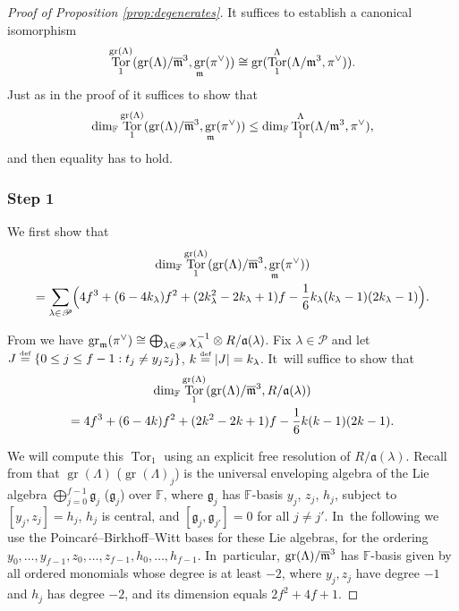 \documentclass[JEP,XML,SOM,Unicode,NoFloatCountersInSection, NoEqCountersInSection,published]{cedram}
\let\ovl\overline
\newcommand{\defeq}{\stackrel{\textrm{\tiny{\upshape{def}}}}{=}}
\newcommand{\F}{\mathbb{F}}
\renewcommand{\P}{\mathscr P}
\DeclareMathOperator{\gr}{gr}
\DeclareMathOperator{\Tor}{Tor}
\theoremstyle{plain}
\theoremstyle{definition}
\begin{document}
\begin{proof}[Proof of Proposition \ref{prop:degenerates}]
It suffices to establish a canonical isomorphism
\[
\Tor_1^{\gr(\Lambda)}(\gr(\Lambda)/\ovl\m^3,\gr_\m(\pi^{\vee}))\cong \gr(\Tor_1^{\Lambda}(\Lambda/\m^3,\pi^{\vee})).
\]
Just as in the proof of \cite[Cor.\,2.4.8 \& Cor.~2.5.1]{BHHMS4} it suffices to show that
\[
\dim_\F \Tor_1^{\gr(\Lambda)}(\gr(\Lambda)/\ovl\m^3,\gr_\m(\pi^{\vee})) \le \dim_\F \Tor_1^{\Lambda}(\Lambda/\m^3,\pi^{\vee}),
\]
and then equality has to hold.

\subsubsection*{Step 1} We first show that
\begin{multline*}
\dim_\F \Tor_1^{\gr(\Lambda)}(\gr(\Lambda)/\ovl\m^3,\gr_\m(\pi^{\vee})) \\ = \sum_{\lambda \in \P} \Bigl(4f^3 + (6-4k_\lambda)f^2 + (2k_\lambda^2-2k_\lambda+1)f - \frac 16 k_\lambda(k_\lambda-1)(2k_\lambda-1)\Bigr).
\end{multline*}

From \cite[Th.\,2.1.2]{BHHMS4} we have
$\gr_\m(\pi^{\vee}) \cong \bigoplus_{\lambda\in\mathscr{P}}\chi_{\lambda}^{-1}\otimes R/\mathfrak{a}(\lambda)$.
Fix $\lambda \in \P$ and let $J \defeq \{0 \le j \le f-1: t_j \ne y_jz_j \}$, $k \defeq |J| = k_\lambda$. It~will suffice to show that
\begin{multline}\label{eq:gr-lambda-formula}
\dim_\F \Tor_1^{\gr(\Lambda)}(\gr(\Lambda)/\ovl\m^3,R/\mathfrak{a}(\lambda))\\
= 4f^3 + (6-4k)f^2 + (2k^2-2k+1)f - \frac 16 k(k-1)(2k-1).
\end{multline}

We will compute this $\Tor_1$ using an explicit free resolution of $R/\mathfrak{a}(\lambda)$.
Recall {from \cite[Eq.\,(19)]{BHHMS4}} that $\gr(\Lambda)$ (\resp $\gr(\Lambda)_j$) is the universal enveloping algebra of the Lie algebra $\bigoplus_{j=0}^{f-1} \mathfrak g_j$ (\resp $\mathfrak g_j$) over $\F$,
where $\mathfrak g_j$ has $\F$-basis $y_j$, $z_j$, $h_j$, subject to $[y_j,z_j] = h_j$, $h_j$ is central, and $[\mathfrak g_j,\mathfrak g_{j'}] = 0$ for all $j \ne j'$. In~the following we use the Poincaré--Birkhoff--Witt bases for these Lie algebras, for the ordering $y_0,\dots,y_{f-1},z_0,\dots,z_{f-1},h_0,\dots,h_{f-1}$. In~particular, $\gr(\Lambda)/\ovl\m^3$ has $\F$-basis given by all ordered monomials whose degree is at least $-2$, where $y_j,z_j$ have degree $-1$ and $h_j$ has degree $-2$, and its dimension equals $2f^2+4f+1$.


\end{proof}
\end{document}
